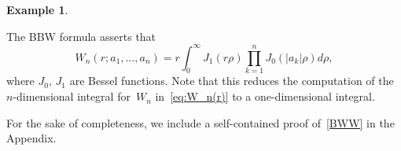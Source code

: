 \documentclass[final ]{IEEEtran}
\newcommand{\suchthat}{\, :  \,}
\newtheorem{example}{Example}
\newcommand {\R}{\mathbb R}
\newcommand{\Z}{\mathbb Z}
\begin{document}
\begin{example}

\end{example}


The BBW formula   asserts  that \begin{equation}\label{BWW}
W_n(r;a_1,\dots,a_n)=r\int_0^\infty J_1(r\rho)\prod_{k=1}^n J_0(|a_k|\rho)d\rho,
\end{equation}
where $J_0,\,J_1$ are Bessel functions. Note that this
reduces the computation of the $n$-dimensional integral for~$W_n$ in~\eqref{eq:W_n(r)}
to a one-dimensional integral. 

For the sake of completeness, we include a self-contained
proof of~\eqref{BWW}
 in the Appendix.

\end{document}

